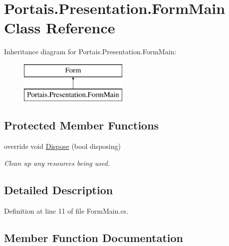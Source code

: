 \hypertarget{class_portais_1_1_presentation_1_1_form_main}{}\section{Portais.\+Presentation.\+Form\+Main Class Reference}
\label{class_portais_1_1_presentation_1_1_form_main}
Inheritance diagram for Portais.\+Presentation.\+Form\+Main\+:\begin{figure}[H]
\begin{center}
\leavevmode
\includegraphics[height=2.000000cm]{class_portais_1_1_presentation_1_1_form_main}
\end{center}
\end{figure}
\subsection*{Protected Member Functions}
\begin{DoxyCompactItemize}
\item 
override void \hyperlink{class_portais_1_1_presentation_1_1_form_main_a11bed83a3c784b4de2dc728699f62ebf}{Dispose} (bool disposing)
\begin{DoxyCompactList}\small\item\em Clean up any resources being used. \end{DoxyCompactList}\end{DoxyCompactItemize}


\subsection{Detailed Description}


Definition at line 11 of file Form\+Main.\+cs.



\subsection{Member Function Documentation}
